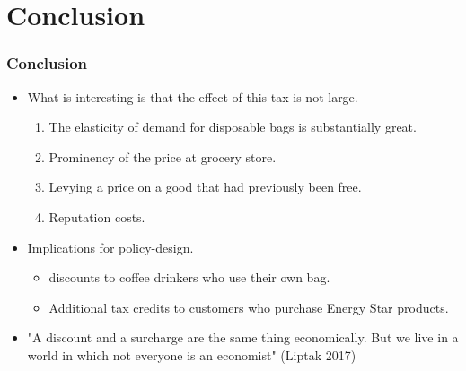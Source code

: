 \documentclass[dvipdfmx,11pt]{beamer}
\begin{document}
\section{Conclusion}
\frame{\sectionpage}

\begin{frame}\frametitle{Conclusion}
  \begin{itemize}
    \item What is interesting is that the effect of this tax is not large.
    \begin{enumerate}
      \item The elasticity of demand for disposable bags is substantially great.
      \item Prominency of the price at grocery store.
      \item Levying a price on a good that had previously been free.
      \item Reputation costs.
    \end{enumerate}
    \item Implications for policy-design.
    \begin{itemize}
      \item discounts to coffee drinkers who use their own bag.
      \item Additional tax credits to customers who purchase Energy Star products.
    \end{itemize}
    \item "A discount and a surcharge are the same thing economically. But we live in a world in which not everyone is an economist" (Liptak 2017)
  \end{itemize}
\end{frame}
\end{document}
